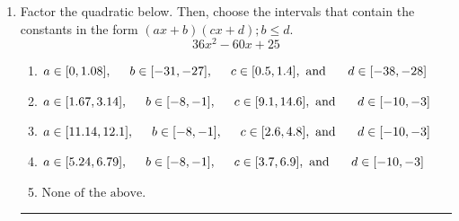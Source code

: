 \documentclass[14pt]{extbook}
\newcommand{\litem}[1]{\item#1\hspace*{-1cm}\rule{\textwidth}{0.4pt}}
\begin{document}
\begin{enumerate}
{\begin{enumerate}[label=\Alph*.]
\end{enumerate} }
\litem{
Factor the quadratic below. Then, choose the intervals that contain the constants in the form $(ax+b)(cx+d); b \leq d.$\[ 36x^{2} -60 x + 25 \]\begin{enumerate}[label=\Alph*.]
\item \( a \in [0, 1.08], \hspace*{5mm} b \in [-31, -27], \hspace*{5mm} c \in [0.5, 1.4], \text{ and } \hspace*{5mm} d \in [-38, -28] \)
\item \( a \in [1.67, 3.14], \hspace*{5mm} b \in [-8, -1], \hspace*{5mm} c \in [9.1, 14.6], \text{ and } \hspace*{5mm} d \in [-10, -3] \)
\item \( a \in [11.14, 12.1], \hspace*{5mm} b \in [-8, -1], \hspace*{5mm} c \in [2.6, 4.8], \text{ and } \hspace*{5mm} d \in [-10, -3] \)
\item \( a \in [5.24, 6.79], \hspace*{5mm} b \in [-8, -1], \hspace*{5mm} c \in [3.7, 6.9], \text{ and } \hspace*{5mm} d \in [-10, -3] \)
\item \( \text{None of the above.} \)


\end{enumerate}}
\end{enumerate}
\end{document}

